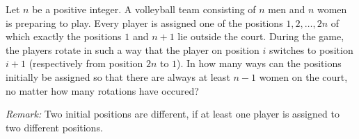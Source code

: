 Let $n$ be a positive integer.
A volleyball team consisting of $n$ men and $n$ women is preparing to play.
Every player is assigned one of the positions $1,2,\ldots,2n$
of which exactly the positions $1$ and $n+1$ lie outside the court.
During the game, the players rotate in such a way that
the player on position $i$ switches to position $i+1$ (respectively from position $2n$ to $1$).
In how many ways can the positions initially be assigned so that
there are always at least $n-1$ women on the court, no matter how many rotations have occured?

\emph{Remark:} Two initial positions are different,
if at least one player is assigned to two different positions.
